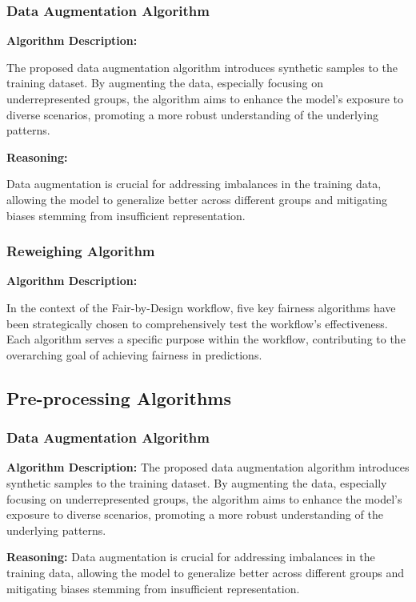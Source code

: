 \subsubsection{Data Augmentation Algorithm}

\textbf{Algorithm Description:}

The proposed data augmentation algorithm introduces synthetic samples to the training dataset. By augmenting the data, especially focusing on underrepresented groups, the algorithm aims to enhance the model's exposure to diverse scenarios, promoting a more robust understanding of the underlying patterns.

\textbf{Reasoning:}

Data augmentation is crucial for addressing imbalances in the training data, allowing the model to generalize better across different groups and mitigating biases stemming from insufficient representation.

\subsubsection{Reweighing Algorithm}

\textbf{Algorithm Description:}

In the context of the Fair-by-Design workflow, five key fairness algorithms have been strategically chosen to comprehensively test the workflow's effectiveness. Each algorithm serves a specific purpose within the workflow, contributing to the overarching goal of achieving fairness in predictions.

\subsection{Pre-processing Algorithms}

\subsubsection{Data Augmentation Algorithm}

\textbf{Algorithm Description:} The proposed data augmentation algorithm introduces synthetic samples to the training dataset. By augmenting the data, especially focusing on underrepresented groups, the algorithm aims to enhance the model's exposure to diverse scenarios, promoting a more robust understanding of the underlying patterns.

\textbf{Reasoning:} Data augmentation is crucial for addressing imbalances in the training data, allowing the model to generalize better across different groups and mitigating biases stemming from insufficient representation.

